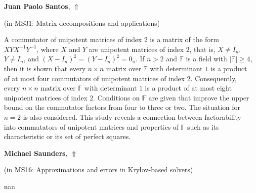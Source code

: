 \documentclass[ILAS2025-program.tex]{subfiles}
\begin{document}
     \hypertarget{down0307}{}\begin{ilasabstract}
    
    \textbf{Juan Paolo Santos},  \hfill \hyperlink{up0307}{$\Uparrow$}
    
    (in {\color{mstitle}MS31: Matrix decompositions and applications})
        
        \mtskip
    A commutator of unipotent matrices of index $2$ is a matrix of the form $XYX^{-1}Y^{-1}$, where $X$ and $Y$ are unipotent matrices of index $2$, that is, $X \ne I_n$, $Y \ne I_n$, and $(X-I_n)^2=(Y-I_n)^2=0_n$. If $n>2$ and $\mathbb{F}$ is a field with $|\mathbb{F}| \geq 4$, then it is shown that every $n \times n$ matrix over $\mathbb{F}$ with determinant $1$ is a product of at most four commutators of unipotent matrices of index $2$. Consequently, every $n \times n$ matrix over $\mathbb{F}$ with determinant $1$ is a product of at most eight unipotent matrices of index $2$. Conditions on $\mathbb{F}$ are given that improve the upper bound on the commutator factors from four to three or two. The situation for $n=2$ is also considered. This study reveals a connection between factorability into commutators of unipotent matrices and properties of $\mathbb{F}$ such as its characteristic or its set of perfect squares.\end{ilasabstract}
     \hypertarget{down0302}{}\begin{ilasabstract}
    
    \textbf{Michael Saunders},  \hfill \hyperlink{up0302}{$\Uparrow$}
    
    (in {\color{mstitle}MS16: Approximations and errors in Krylov-based solvers})
        
        \mtskip
    nan\end{ilasabstract}
\end{document}
